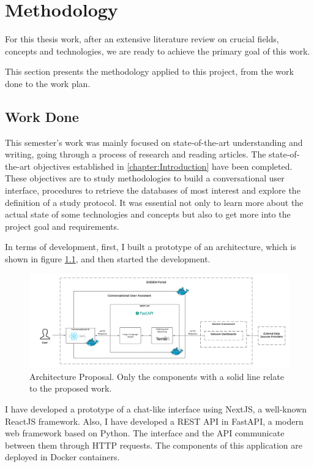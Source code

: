 \chapter{Methodology}
\label{chapter:Methodology}

For this thesis work, after an extensive literature review on crucial fields, concepts and technologies, we are ready to achieve the primary goal of this work.

This section presents the methodology applied to this project, from the work done to the work plan.

\section{Work Done}

This semester's work was mainly focused on state-of-the-art understanding and writing, going through a process of research and reading articles. The state-of-the-art objectives established in \autoref{chapter:Introduction} have been completed. These objectives are to study methodologies to build a conversational user interface, procedures to retrieve the databases of most interest and explore the definition of a study protocol. It was essential not only to learn more about the actual state of some technologies and concepts but also to get more into the project goal and requirements.

In terms of development, first, I built a prototype of an architecture, which is shown in figure \ref{fig_arch}, and then started the development.

\begin{figure}[ht]
    \includegraphics[width=16cm]{figs/chapter3/arquitetura.png}
    \centering
    \caption{Architecture Proposal. Only the components with a solid line relate to the proposed work.}
    \label{fig_arch}
\end{figure}

I have developed a prototype of a chat-like interface using NextJS, a well-known ReactJS framework. Also, I have developed a REST API in FastAPI, a modern web framework based on Python. The interface and the API communicate between them through HTTP requests. The components of this application are deployed in Docker containers.

